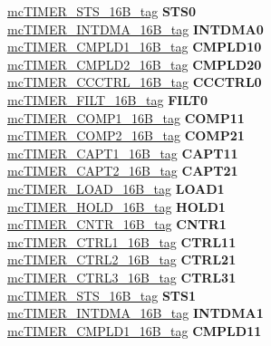 \begin{DoxyCompactItemize}
\begin{tabbing}
\>\>\mbox{\hyperlink{unionmcTIMER__STS__16B__tag}{mcTIMER\_STS\_16B\_tag}} {\bfseries STS0}\\
\>\>\mbox{\hyperlink{unionmcTIMER__INTDMA__16B__tag}{mcTIMER\_INTDMA\_16B\_tag}} {\bfseries INTDMA0}\\
\>\>\mbox{\hyperlink{unionmcTIMER__CMPLD1__16B__tag}{mcTIMER\_CMPLD1\_16B\_tag}} {\bfseries CMPLD10}\\
\>\>\mbox{\hyperlink{unionmcTIMER__CMPLD2__16B__tag}{mcTIMER\_CMPLD2\_16B\_tag}} {\bfseries CMPLD20}\\
\>\>\mbox{\hyperlink{unionmcTIMER__CCCTRL__16B__tag}{mcTIMER\_CCCTRL\_16B\_tag}} {\bfseries CCCTRL0}\\
\>\>\mbox{\hyperlink{unionmcTIMER__FILT__16B__tag}{mcTIMER\_FILT\_16B\_tag}} {\bfseries FILT0}\\
\>\>\mbox{\hyperlink{unionmcTIMER__COMP1__16B__tag}{mcTIMER\_COMP1\_16B\_tag}} {\bfseries COMP11}\\
\>\>\mbox{\hyperlink{unionmcTIMER__COMP2__16B__tag}{mcTIMER\_COMP2\_16B\_tag}} {\bfseries COMP21}\\
\>\>\mbox{\hyperlink{unionmcTIMER__CAPT1__16B__tag}{mcTIMER\_CAPT1\_16B\_tag}} {\bfseries CAPT11}\\
\>\>\mbox{\hyperlink{unionmcTIMER__CAPT2__16B__tag}{mcTIMER\_CAPT2\_16B\_tag}} {\bfseries CAPT21}\\
\>\>\mbox{\hyperlink{unionmcTIMER__LOAD__16B__tag}{mcTIMER\_LOAD\_16B\_tag}} {\bfseries LOAD1}\\
\>\>\mbox{\hyperlink{unionmcTIMER__HOLD__16B__tag}{mcTIMER\_HOLD\_16B\_tag}} {\bfseries HOLD1}\\
\>\>\mbox{\hyperlink{unionmcTIMER__CNTR__16B__tag}{mcTIMER\_CNTR\_16B\_tag}} {\bfseries CNTR1}\\
\>\>\mbox{\hyperlink{unionmcTIMER__CTRL1__16B__tag}{mcTIMER\_CTRL1\_16B\_tag}} {\bfseries CTRL11}\\
\>\>\mbox{\hyperlink{unionmcTIMER__CTRL2__16B__tag}{mcTIMER\_CTRL2\_16B\_tag}} {\bfseries CTRL21}\\
\>\>\mbox{\hyperlink{unionmcTIMER__CTRL3__16B__tag}{mcTIMER\_CTRL3\_16B\_tag}} {\bfseries CTRL31}\\
\>\>\mbox{\hyperlink{unionmcTIMER__STS__16B__tag}{mcTIMER\_STS\_16B\_tag}} {\bfseries STS1}\\
\>\>\mbox{\hyperlink{unionmcTIMER__INTDMA__16B__tag}{mcTIMER\_INTDMA\_16B\_tag}} {\bfseries INTDMA1}\\
\>\>\mbox{\hyperlink{unionmcTIMER__CMPLD1__16B__tag}{mcTIMER\_CMPLD1\_16B\_tag}} {\bfseries CMPLD11}\\

\end{tabbing}
\end{DoxyCompactItemize}
